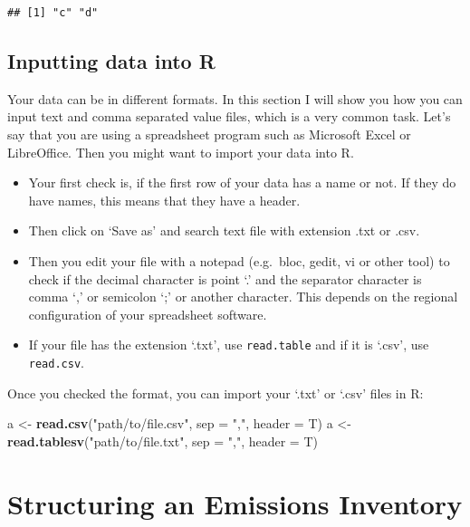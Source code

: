 \documentclass[12pt,graybox,envcountchap,sectrefs]{krantz}
\makeatletter
\newenvironment{Shaded}{\begin{snugshade}}{\end{snugshade}}
\newcommand{\KeywordTok}[1]{\textcolor[rgb]{0.13,0.29,0.53}{\textbf{#1}}}
\newcommand{\DataTypeTok}[1]{\textcolor[rgb]{0.13,0.29,0.53}{#1}}
\newcommand{\StringTok}[1]{\textcolor[rgb]{0.31,0.60,0.02}{#1}}
\newcommand{\NormalTok}[1]{#1}
\providecommand{\tightlist}{%
  \setlength{\itemsep}{0pt}\setlength{\parskip}{0pt}}
\newenvironment{kframe}{%
\medskip{}
\setlength{\fboxsep}{.8em}
 \def\at@end@of@kframe{}%
 \ifinner\ifhmode%
  \def\at@end@of@kframe{\end{minipage}}%
  \begin{minipage}{\columnwidth}%
 \fi\fi%
 \def\FrameCommand##1{\hskip\@totalleftmargin \hskip-\fboxsep
 \colorbox{shadecolor}{##1}\hskip-\fboxsep
     \hskip-\linewidth \hskip-\@totalleftmargin \hskip\columnwidth}%
 \MakeFramed {\advance\hsize-\width
   \@totalleftmargin\z@ \linewidth\hsize
   \@setminipage}}%
 {\par\unskip\endMakeFramed%
 \at@end@of@kframe}
\renewenvironment{Shaded}{\begin{kframe}}{\end{kframe}}
\theoremstyle{definition}
\theoremstyle{definition}
\theoremstyle{definition}
\theoremstyle{remark}
\makeatother
\begin{document}
\begin{verbatim}
## [1] "c" "d"
\end{verbatim}

\section{Inputting data into R}\label{inputting-data-into-r}

Your data can be in different formats. In this section I will show you
how you can input text and comma separated value files, which is a very
common task. Let's say that you are using a spreadsheet program such as
Microsoft Excel or LibreOffice. Then you might want to import your data
into R.

\begin{itemize}
\tightlist
\item
  Your first check is, if the first row of your data has a name or not.
  If they do have names, this means that they have a header.
\item
  Then click on `Save as' and search text file with extension .txt or
  .csv.
\item
  Then you edit your file with a notepad (e.g.~bloc, gedit, vi or other
  tool) to check if the decimal character is point `.' and the separator
  character is comma `,' or semicolon `;' or another character. This
  depends on the regional configuration of your spreadsheet software.
\item
  If your file has the extension `.txt', use \texttt{read.table} and if
  it is `.csv', use \texttt{read.csv}.
\end{itemize}

Once you checked the format, you can import your `.txt' or `.csv' files
in R:

\begin{Shaded}
\begin{Highlighting}[]
\NormalTok{a <-}\StringTok{ }\KeywordTok{read.csv}\NormalTok{(}\StringTok{"path/to/file.csv"}\NormalTok{, }\DataTypeTok{sep =} \StringTok{","}\NormalTok{, }\DataTypeTok{header =}\NormalTok{ T)}
\NormalTok{a <-}\StringTok{ }\KeywordTok{read.tablesv}\NormalTok{(}\StringTok{"path/to/file.txt"}\NormalTok{, }\DataTypeTok{sep =} \StringTok{","}\NormalTok{, }\DataTypeTok{header =}\NormalTok{ T)}
\end{Highlighting}
\end{Shaded}

\chapter{Structuring an Emissions Inventory}\label{st}
\end{document}

